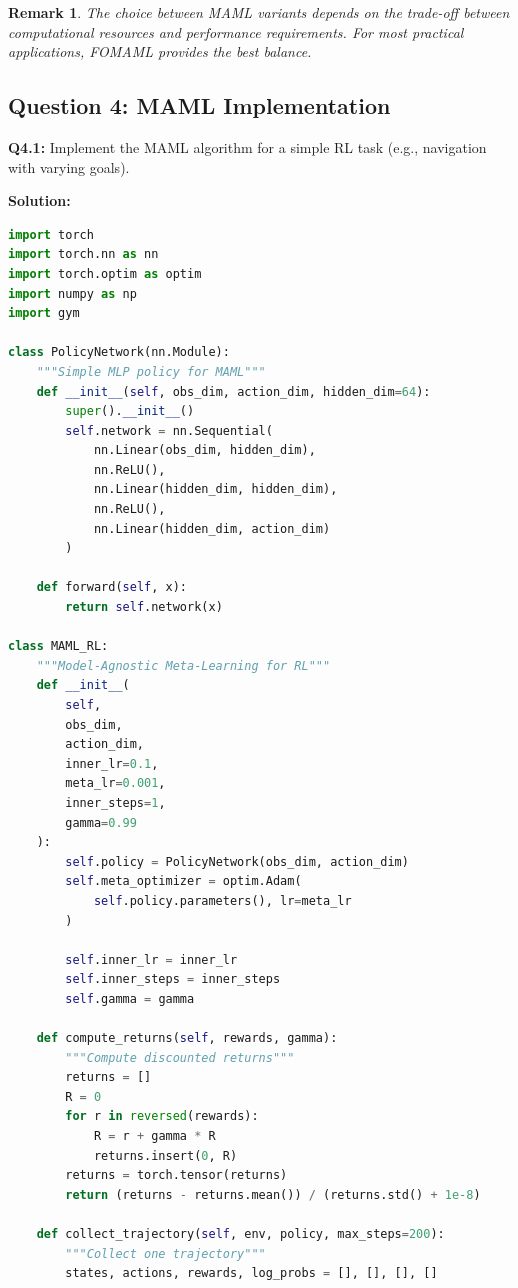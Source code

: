 \documentclass[12pt]{article}
\newtheorem{remark}{Remark}
\begin{document}
{{			\begin{remark}
			The choice between MAML variants depends on the trade-off between computational resources and performance requirements. For most practical applications, FOMAML provides the best balance.
			\end{remark}
			
			\subsection{Question 4: MAML Implementation}
			
			\textbf{Q4.1:} Implement the MAML algorithm for a simple RL task (e.g., navigation with varying goals).
			
			\textbf{Solution:}
			
			\begin{lstlisting}[language=Python, caption=MAML Implementation for RL]
import torch
import torch.nn as nn
import torch.optim as optim
import numpy as np
import gym

class PolicyNetwork(nn.Module):
    """Simple MLP policy for MAML"""
    def __init__(self, obs_dim, action_dim, hidden_dim=64):
        super().__init__()
        self.network = nn.Sequential(
            nn.Linear(obs_dim, hidden_dim),
            nn.ReLU(),
            nn.Linear(hidden_dim, hidden_dim),
            nn.ReLU(),
            nn.Linear(hidden_dim, action_dim)
        )

    def forward(self, x):
        return self.network(x)

class MAML_RL:
    """Model-Agnostic Meta-Learning for RL"""
    def __init__(
        self,
        obs_dim,
        action_dim,
        inner_lr=0.1,
        meta_lr=0.001,
        inner_steps=1,
        gamma=0.99
    ):
        self.policy = PolicyNetwork(obs_dim, action_dim)
        self.meta_optimizer = optim.Adam(
            self.policy.parameters(), lr=meta_lr
        )

        self.inner_lr = inner_lr
        self.inner_steps = inner_steps
        self.gamma = gamma

    def compute_returns(self, rewards, gamma):
        """Compute discounted returns"""
        returns = []
        R = 0
        for r in reversed(rewards):
            R = r + gamma * R
            returns.insert(0, R)
        returns = torch.tensor(returns)
        return (returns - returns.mean()) / (returns.std() + 1e-8)

    def collect_trajectory(self, env, policy, max_steps=200):
        """Collect one trajectory"""
        states, actions, rewards, log_probs = [], [], [], []


\end{lstlisting}}}
\end{document}
